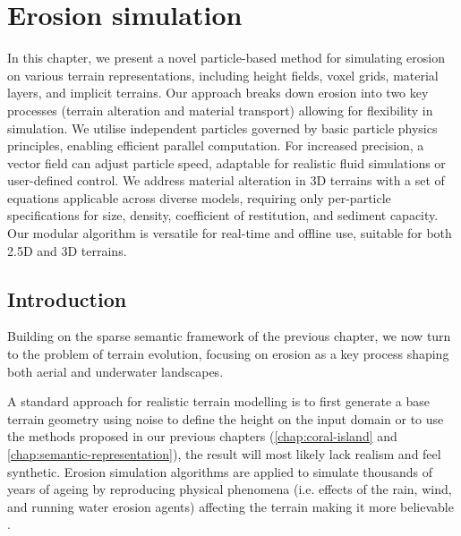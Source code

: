 \chapter{Erosion simulation}
\label{chap:erosion}


\abstract




In this chapter, we present a novel particle-based method for simulating erosion on various terrain representations, including height fields, voxel grids, material layers, and implicit terrains. Our approach breaks down erosion into two key processes (terrain alteration and material transport) allowing for flexibility in simulation. We utilise independent particles governed by basic particle physics principles, enabling efficient parallel computation. For increased precision, a vector field can adjust particle speed, adaptable for realistic fluid simulations or user-defined control. We address material alteration in 3D terrains with a set of equations applicable across diverse models, requiring only per-particle specifications for size, density, coefficient of restitution, and sediment capacity. Our modular algorithm is versatile for real-time and offline use, suitable for both 2.5D and 3D terrains.
\pagebreak

\minitoc

\section{Introduction}
Building on the sparse semantic framework of the previous chapter, we now turn to the problem of terrain evolution, focusing on erosion as a key process shaping both aerial and underwater landscapes. 

A standard approach for realistic terrain modelling is to first generate a base terrain geometry using noise to define the height on the input domain \cite{Musgrave1989, Olsen2004, Roudier1993} or to use the methods proposed in our previous chapters (\cref{chap:coral-island} and \cref{chap:semantic-representation}), the result will most likely lack realism and feel synthetic. Erosion simulation algorithms are applied to simulate thousands of years of ageing by reproducing physical phenomena (i.e. effects of the rain, wind, and running water erosion agents) affecting the terrain making it more believable \cite{Stachniak2005, Smelik2009, Galin2019}.

